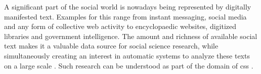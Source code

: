 \documentclass[11pt, numbers=noenddot]{scrreprt}
\let\cite\parencite  %
\begin{document}
%
%
%
%
%
%
%
%
%
A significant part of the social world is nowadays being represented by digitally manifested text. Examples for this range from instant messaging, social media and any form of collective web activity to encyclopaedic websites, digitized libraries and government intelligence. The amount and richness of available social text makes it a valuable data source for social science research, while simultaneously creating an interest in automatic systems to analyze these texts on a large scale \cite{evansMachineTranslationMining2016}. Such research can be understood as part of the domain of \gls{css} \cite{lazerComputationalSocialScience2009}.
\end{document}
